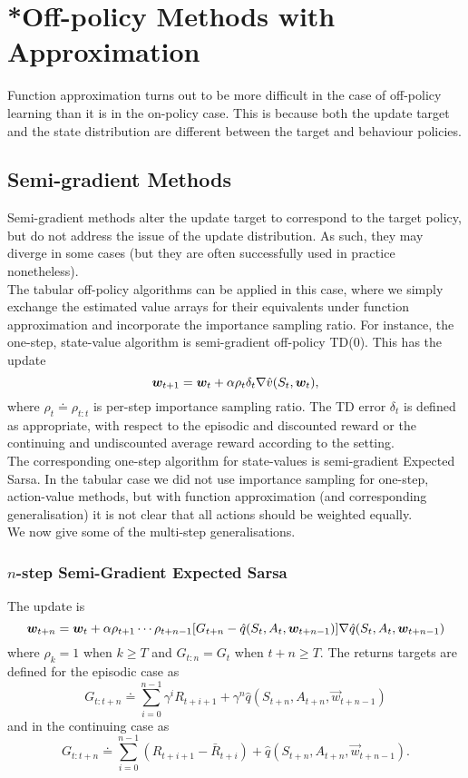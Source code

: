\section{*Off-policy Methods with Approximation}

Function approximation turns out to be more difficult in the case of off-policy learning than it is in the on-policy case. This is because both the update target and the state distribution are different between the target and behaviour policies.

\subsection{Semi-gradient Methods}
Semi-gradient methods alter the update target to correspond to the target policy, but do not address the issue of the update distribution. As such, they may diverge in some cases (but they are often successfully used in practice nonetheless).\\

The tabular off-policy algorithms can be applied in this case, where we simply exchange the estimated value arrays for their equivalents under function approximation and incorporate the importance sampling ratio. For instance, the one-step, state-value algorithm is semi-gradient off-policy TD(0). This has the update
\begin{equation}
    \boldsymbol{w}_{t+1} = \boldsymbol{w}_t + \alpha \rho_t \delta_t \nabla \hat{v}(S_t, \boldsymbol{w}_t),
\end{equation}
where $\rho_t \doteq \rho_{t:t}$ is per-step importance sampling ratio. The TD error $\delta_t$ is defined as appropriate, with respect to the episodic and discounted reward or the continuing and undiscounted average reward according to the setting. \\

The corresponding one-step algorithm for state-values is semi-gradient Expected Sarsa. In the tabular case we did not use importance sampling for one-step, action-value methods, but with function approximation (and corresponding generalisation) it is not clear that all actions should be weighted equally.\\

We now give some of the multi-step generalisations.

\subsubsection*{$n$-step Semi-Gradient Expected Sarsa}
The update is 
\begin{equation}
    \boldsymbol{w}_{t+n} = \boldsymbol{w}_t + \alpha \rho_{t+1}\cdots\rho_{t+n-1} [G_{t+n} - \hat{q}(S_t, A_t, \boldsymbol{w}_{t+n-1})] \nabla \hat{q}(S_t, A_t, \boldsymbol{w}_{t+n-1})
\end{equation}
where $\rho_k = 1$ when $k \geq T$ and $G_{t:n} = G_t$ when $t+n\geq T$. The returns targets are defined for the episodic case as
\[
    G_{t:t+n} \doteq \sum_{i=0}^{n-1} \gamma^iR_{t+i+1} + \gamma^n \hat{q}(S_{t+n}, A_{t+n}, \vec{w}_{t+n-1})
\]
and in the continuing case as
\[
    G_{t:t+n} \doteq \sum_{i=0}^{n-1} \left(R_{t+i+1} -  \bar{R}_{t+i}\right) + \hat{q}(S_{t+n}, A_{t+n}, \vec{w}_{t+n-1}).
\]

